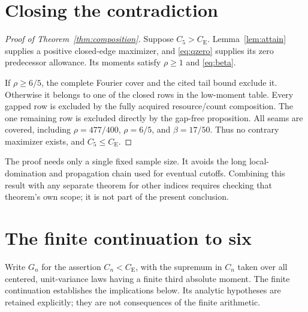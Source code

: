 \documentclass[11pt,a4paper]{article}
\theoremstyle{definition}
\newcommand{\CE}{C_{\mathrm E}}
\begin{document}
\section{Closing the contradiction}
\begin{proof}[Proof of Theorem~\ref{thm:composition}]
Suppose $C_5>\CE$. Lemma~\ref{lem:attain} supplies a positive closed-edge
maximizer, and \eqref{eq:qzero} supplies its zero predecessor allowance.
Its moments satisfy $\rho\ge1$ and \eqref{eq:beta}.

If $\rho\ge6/5$, the complete Fourier cover and the cited tail bound
exclude it. Otherwise it belongs to one of the closed rows in the
low-moment table. Every gapped row is excluded by the fully acquired
resource/count composition. The one remaining row is excluded directly
by the gap-free proposition. All seams are covered, including
$\rho=477/400$, $\rho=6/5$, and $\beta=17/50$. Thus no contrary
maximizer exists, and $C_5\le\CE$.
\end{proof}

The proof needs only a single fixed sample size. It avoids the long
local-domination and propagation chain used for eventual cutoffs. Combining
this result with any separate theorem for other indices requires checking
that theorem's own scope; it is not part of the present conclusion.


\section{The finite continuation to six}
\label{cut6:section}

Write \(G_n\) for the assertion \(C_n<\CE\), with the supremum in
\(C_n\) taken over all centered, unit-variance laws having a finite
third absolute moment. The finite continuation \cite{Cutoff6Continuation}
establishes the implications below. Its analytic hypotheses are retained
explicitly; they are not consequences of the finite arithmetic.
\end{document}
